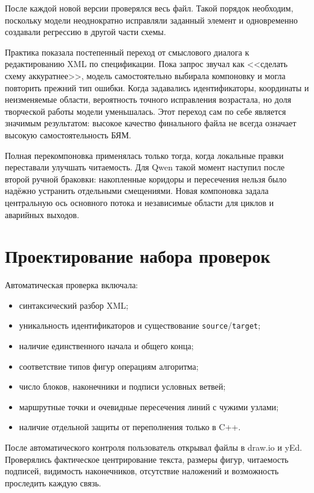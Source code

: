 \documentclass[a4paper,12pt]{extreport}
\newcommand{\code}[1]{\texttt{#1}}
\begin{document}
После каждой новой версии проверялся весь файл. Такой порядок необходим, поскольку модели неоднократно исправляли заданный элемент и одновременно создавали регрессию в другой части схемы.

Практика показала постепенный переход от смыслового диалога к редактированию XML по спецификации. Пока запрос звучал как <<сделать схему аккуратнее>>, модель самостоятельно выбирала компоновку и могла повторить прежний тип ошибки. Когда задавались идентификаторы, координаты и неизменяемые области, вероятность точного исправления возрастала, но доля творческой работы модели уменьшалась. Этот переход сам по себе является значимым результатом: высокое качество финального файла не всегда означает высокую самостоятельность БЯМ.

Полная перекомпоновка применялась только тогда, когда локальные правки переставали улучшать читаемость. Для Qwen такой момент наступил после второй ручной браковки: накопленные коридоры и пересечения нельзя было надёжно устранить отдельными смещениями. Новая компоновка задала центральную ось основного потока и независимые области для циклов и аварийных выходов.

\section{Проектирование набора проверок}

Автоматическая проверка включала:

\begin{itemize}
  \item синтаксический разбор XML;
  \item уникальность идентификаторов и существование \code{source}/\code{target};
  \item наличие единственного начала и общего конца;
  \item соответствие типов фигур операциям алгоритма;
  \item число блоков, наконечники и подписи условных ветвей;
  \item маршрутные точки и очевидные пересечения линий с чужими узлами;
  \item наличие отдельной защиты от переполнения только в C++.
\end{itemize}

После автоматического контроля пользователь открывал файлы в draw.io и yEd. Проверялись фактическое центрирование текста, размеры фигур, читаемость подписей, видимость наконечников, отсутствие наложений и возможность проследить каждую связь.
\end{document}
